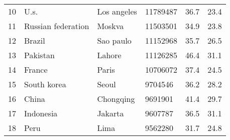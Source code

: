 \begin{center}
\begin{longtable}{clllcc}
        10                                       & U.s.                                 & Los angeles                       & 11789487                                & 36.7                                  & 23.4                                  \\
        11                                       & Russian federation                   & Moskva                            & 11503501                                & 34.9                                  & 23.8                                  \\
        12                                       & Brazil                               & Sao paulo                         & 11152968                                & 35.7                                  & 26.5                                  \\
        13                                       & Pakistan                             & Lahore                            & 11126285                                & 46.4                                  & 31.1                                  \\
        14                                       & France                               & Paris                             & 10706072                                & 37.4                                  & 24.5                                  \\
        15                                       & South korea                          & Seoul                             & 9704546                                 & 36.2                                  & 28.2                                  \\
        16                                       & China                                & Chongqing                         & 9691901                                 & 41.4                                  & 29.7                                  \\
        17                                       & Indonesia                            & Jakarta                           & 9607787                                 & 36.5                                  & 31.1                                  \\
        18                                       & Peru                                 & Lima                              & 9562280                                 & 31.7                                  & 24.8                                  \\

\end{longtable}
\end{center}
